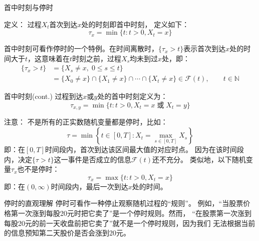\documentclass[t]{beamer}
\begin{document}
      \begin{frame}{首中时刻与停时}
        \begin{block}{定义：}
          过程$X_t$首次到达$x$处的时刻即首中时刻， 定义如下：
          \begin{equation*}
          \tau_x =\min\{t: t>0, X_t=x\}
          \end{equation*}
          \end{block}
          
          首中时刻可看作停时的一个特例。在时间离散时，$\{\tau_x>t\}$表示首次到达$x$处的时间大于$t$，这意味着在$t$时刻之前，过程$X_s$均未到过$x$处，即：
          \begin{equation*}
          \begin{split}
          \{\tau_x>t\}&=\{X_s\ne x, \; 0\le s\le t\}\\
          &=\{X_0\ne x\}\cap \{X_1\ne x\}\cap \cdots \cap \{X_t\ne x\} \in \mathcal{F}(t), \qquad  t\in \mathbb{N}
          \end{split}
          \end{equation*}
      \end{frame}


      \begin{frame}{首中时刻(cont.)}
        过程到达$x$或$y$处的首中时刻定义为：
\begin{equation*}
\tau_{x,y} = \min\{t: t>0, X_t=x\;\text{或}\;X_t=y \}
\end{equation*}

\begin{block}{注意：}\small
  不是所有的正实数随机变量都是停时，比如：
\[\tau=\min\left\{t\in[0,T]: X_t=\max_{s\in[0,T]} X_s \right\} \]
即：在$[0,T]$时间段内，首次到达该区间最大值的对应时点。
因为在该时间段内，决定$\{\tau >t\}$这一事件是否成立的信息$\mathcal{F}(t)$还不充分。
类似地，以下随机变量$\tau_x$也不是停时：
\[\tau_x =\max\{t: t>0, X_t=x\} \]
即：在$(0,\infty)$时间段内，最后一次到达$x$处的时间。
\end{block}
      \end{frame}



      \begin{frame}{停时的直观理解}
        停时可看作一种停止观察随机过程的“规则”。
例如，“当股票价格第一次涨到每股20元时把它卖了”是一个停时规则。然而，
“在股票第一次涨到每股20元的{\color{red}前一天收盘前}把它卖了”就不是一个停时规则，因为我们
无法根据当前的信息预知第二天股价是否会涨到20元。
      \end{frame}
\end{document}
